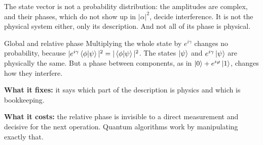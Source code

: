 The state vector is not a probability distribution: the amplitudes are complex,
and their phases, which do not show up in $|\alpha|^2$, decide interference. It is
not the physical system either, only its description. And not all of its phase is
physical.

\begin{concept}{Global and relative phase}
Multiplying the whole state by $e^{i\gamma}$ changes no probability, because
$|e^{i\gamma}\braket{\phi|\psi}|^2 = |\braket{\phi|\psi}|^2$. The states
$\ket{\psi}$ and $e^{i\gamma}\ket{\psi}$ are physically the same. But a phase
between components, as in $\ket{0} + e^{i\varphi}\ket{1}$, changes how they
interfere.

\textbf{What it fixes:} it says which part of the description is physics and which
is bookkeeping.

\textbf{What it costs:} the relative phase is invisible to a direct measurement
and decisive for the next operation. Quantum algorithms work by manipulating
exactly that.
\end{concept}
